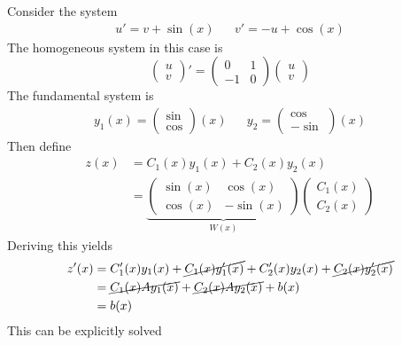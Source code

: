 \documentclass[../../script.tex]{subfiles}
\begin{document}
\begin{eg}
    Consider the system 
    \begin{align*}
        u' = v + \sin(x) && v' = -u + \cos(x)
    \end{align*}
    The homogeneous system in this case is 
    \[
        \begin{pmatrix}
            u \\ v
        \end{pmatrix}'
        =
        \begin{pmatrix}
            0 & 1 \\ -1 & 0
        \end{pmatrix}
        \begin{pmatrix}
            u \\ v
        \end{pmatrix}
    \]
    The fundamental system is 
    \begin{align*}
        y_1(x) = \begin{pmatrix}
            \sin \\ \cos
        \end{pmatrix}(x)
        &&
        y_2 = \begin{pmatrix}
            \cos \\ -\sin 
        \end{pmatrix}(x)
    \end{align*}
    Then define 
    \begin{align*}
        z(x) &= C_1(x)y_1(x) + C_2(x)y_2(x) \\
        &= \underbrace{\begin{pmatrix}
            \sin(x) & \cos(x) \\
            \cos(x) & -\sin(x)
        \end{pmatrix}}_{W(x)}
        \begin{pmatrix}
            C_1(x) \\ C_2(x)
        \end{pmatrix}
    \end{align*}
    Deriving this yields 
    \begin{align*}
        z'(x) &= C_1'(x)y_1(x) + \cancel{C_1(x)y_1'(x)} + C_2'(x)y_2(x) + \cancel{C_2(x)y_2'(x)} \\
        &= \cancel{C_1(x)Ay_1(x)} + \cancel{C_2(x)Ay_2(x)} + b(x) \\
        &= b(x)
    \end{align*}
    This can be explicitly solved
    \begin{align*}

\end{align*}
\end{eg}
\end{document}
